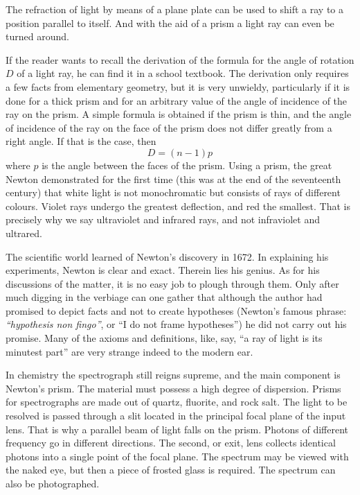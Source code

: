 The refraction of light by means of a plane plate can be used to shift a ray to a position parallel to itself. And with the aid of a prism a light ray can even be turned around.

If the reader wants to recall the derivation of the for­mula for the angle of rotation $D$ of a light ray, he can find it in a school textbook. The derivation only requires a few facts from elementary geometry, but it is very un­wieldy, particularly if it is done for a thick prism and for an arbitrary value of the angle of incidence of the ray on the prism. A simple formula is obtained if the prism is thin, and the angle of incidence of the ray on the face of the prism does not differ greatly from a right angle. If that is the case, then
\begin{equation*}%
D = (n-1) p
\end{equation*}
where $p$ is the angle between the faces of the prism. Using a prism, the great Newton demonstrated for the first time (this was at the end of the seventeenth century) that white light is not monochromatic but consists of rays
of different colours. Violet rays undergo the greatest de­flection, and red the smallest. That is precisely why we say ultraviolet and infrared rays, and not infraviolet and ultrared.

The scientific world learned of Newton’s discovery in 1672. In explaining his experiments, Newton is clear and exact. Therein lies his genius. As for his discussions of the matter, it is no easy job to plough through them. Only after much digging in the verbiage can one gather that although the author had promised to depict facts and not to create hypotheses (Newton’s famous phrase: \emph{``hypothesis non fingo''}, or ``I do not frame hypotheses'') he did not carry out his promise. Many of the axioms and defini­tions, like, say, ``a ray of light is its minutest part'' are very strange indeed to the modern ear.

In chemistry the spectrograph still reigns supreme, and the main component is Newton’s prism. The material must possess a high degree of dispersion. Prisms for spec­trographs are made out of quartz, fluorite, and rock salt. The light to be resolved is passed through a slit located in the principal focal plane of the input lens. That is why a parallel beam of light falls on the prism. Photons of different frequency go in different directions. The sec­ond, or exit, lens collects identical photons into a single point of the focal plane. The spectrum may be viewed with the naked eye, but then a piece of frosted glass is required. The spectrum can also be photographed.

